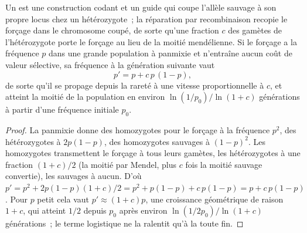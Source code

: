 \begin{theorem}\label{thm:b3:genetic-engineering:drive}
Un \emph{} est une construction codant  et un
guide qui coupe l'allèle sauvage à son propre locus chez un
hétérozygote~; la réparation par recombinaison recopie le forçage dans
le chromosome coupé, de sorte qu'une fraction $c$ des gamètes de
l'hétérozygote porte le forçage au lieu de la moitié mendélienne. Si le
forçage a la fréquence $p$ dans une grande population à panmixie et
n'entraîne aucun coût de valeur sélective, sa fréquence à la génération
suivante vaut
\[
p' = p + c\,p\,(1 - p),
\]
de sorte qu'il se propage depuis la rareté à une vitesse
proportionnelle à $c$, et atteint la moitié de la population en
environ $\ln(1/p_{0})/\ln(1 + c)$ générations à partir d'une fréquence
initiale $p_{0}$.
\end{theorem}
\begin{proof}
La panmixie donne des homozygotes pour le forçage à la fréquence
$p^{2}$, des hétérozygotes à $2p(1-p)$, des homozygotes sauvages à
$(1-p)^{2}$. Les homozygotes transmettent le forçage à tous leurs
gamètes, les hétérozygotes à une fraction $(1 + c)/2$ (la moitié par
Mendel, plus $c$ fois la moitié sauvage convertie), les sauvages à
aucun. D'où $p' = p^{2} + 2p(1-p)(1+c)/2
= p^{2} + p(1-p) + c\,p(1-p) = p + c\,p(1-p)$. Pour $p$ petit cela vaut
$p' \approx (1+c)p$, une croissance géométrique de raison $1 + c$, qui
atteint $1/2$ depuis $p_{0}$ après environ
$\ln(1/2p_{0})/\ln(1+c)$ générations~; le terme logistique ne la
ralentit qu'à la toute fin.
\end{proof}

